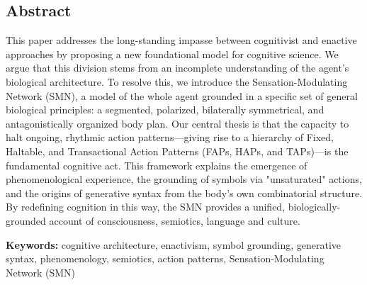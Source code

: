 \subsection*{Abstract}
This paper addresses the long-standing impasse between cognitivist and enactive approaches by proposing a new foundational model for cognitive science. We argue that this division stems from an incomplete understanding of the agent's biological architecture. To resolve this, we introduce the Sensation-Modulating Network (SMN), a model of the whole agent grounded in a specific set of general biological principles: a segmented, polarized, bilaterally symmetrical, and antagonistically organized body plan. Our central thesis is that the capacity to halt ongoing, rhythmic action patterns—giving rise to a hierarchy of Fixed, Haltable, and Transactional Action Patterns (FAPs, HAPs, and TAPs)—is the fundamental cognitive act. This framework explains the emergence of phenomenological experience, the grounding of symbols via "unsaturated" actions, and the origins of generative syntax from the body's own combinatorial structure. By redefining cognition in this way, the SMN provides a unified, biologically-grounded account of consciousness, semiotics, language and culture.

\bigskip
\noindent \textbf{Keywords:} cognitive architecture, enactivism, symbol grounding, generative syntax, phenomenology, semiotics, action patterns, Sensation-Modulating Network (SMN)